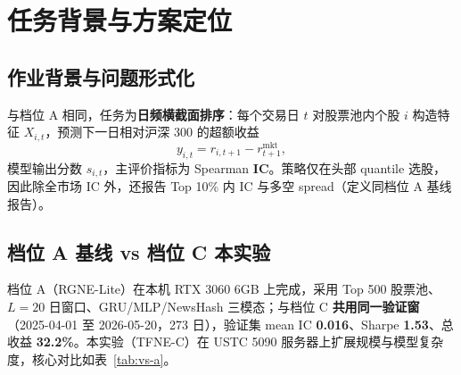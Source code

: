 \documentclass[UTF8,a4paper,12pt]{ctexart}
\begin{document}
\tableofcontents
\newpage

\section{任务背景与方案定位}

\subsection{作业背景与问题形式化}

与档位 A 相同，任务为\textbf{日频横截面排序}：每个交易日 $t$ 对股票池内个股 $i$ 构造特征 $X_{i,t}$，预测下一日相对沪深 300 的超额收益
\begin{equation}
  y_{i,t} = r_{i,t+1} - r^{\mathrm{mkt}}_{t+1},
\end{equation}
模型输出分数 $s_{i,t}$，主评价指标为 Spearman \textbf{IC}。策略仅在头部 quantile 选股，因此除全市场 IC 外，还报告 Top 10\% 内 IC 与多空 spread（定义同档位 A 基线报告）。

\subsection{档位 A 基线 vs 档位 C 本实验}

档位 A（RGNE-Lite）在本机 RTX 3060 6GB 上完成，采用 Top 500 股票池、$L=20$ 日窗口、GRU/MLP/NewsHash 三模态；与档位 C \textbf{共用同一验证窗}（2025-04-01 至 2026-05-20，273 日），验证集 mean IC \textbf{0.016}、Sharpe \textbf{1.53}、总收益 \textbf{32.2\%}。本实验（TFNE-C）在 USTC 5090 服务器上扩展规模与模型复杂度，核心对比如表~\ref{tab:vs-a}。
\end{document}
